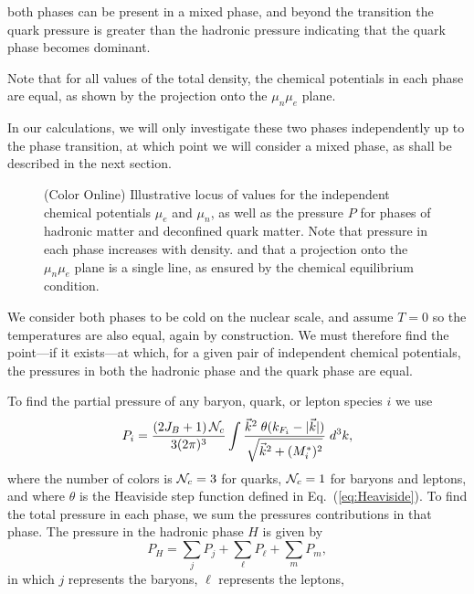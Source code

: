 \documentclass[11pt,a4paper,twoside]{carrollthesis}
\newcommand{\be}{\begin{equation}}
\newcommand{\ee}{\end{equation}}
\newcommand{\bra}{\langle}
\newcommand{\ket}{\rangle}
\newcommand{\s}{\sigma}
\newcommand{\w}{\omega}
\newcommand{\reci}[1]{\frac{1}{#1}}
\newcommand{\emdash}{\hspace{1pt}---\hspace{1pt}}
\begin{document}
both phases can be present in a mixed phase, and beyond the transition
the quark pressure is greater than the hadronic pressure indicating
that the quark phase becomes dominant.\par
%
Note that for all values of the total density, the chemical potentials
in each phase are equal, as shown by the projection onto the
$\mu_n$$\mu_e$ plane.\par
%
In our calculations, we will only
investigate these two phases independently up to the phase transition,
at which point we will consider a mixed phase, as shall be described
in the next section.\par
%
\begin{figure}[!t]
\centering
\caption[Illustrative locus of phase transition variables]{(Color
  Online) Illustrative locus of values for the independent chemical
  potentials $\mu_e$ and $\mu_n$, as well as the pressure $P$ for
  phases of hadronic matter and deconfined quark matter. Note that
  pressure in each phase increases with density. and that a projection
  onto the $\mu_n\mu_e$ plane is a single line, as ensured by the
  chemical equilibrium condition. \protect\label{fig:3d}}
\end{figure}
%
We consider both phases to be cold on the nuclear scale, and assume
$T=0$ so the temperatures are also equal, again by construction. We
must therefore find the point\emdash if it exists\emdash at which, for
a given pair of independent chemical potentials, the pressures in both
the hadronic phase and the quark phase are equal.\par
%
To find the partial pressure of any baryon, quark, or lepton species
$i$ we use
%
\be \label{eq:pressures} P_i = \frac{\left(2J_B + 1\right) {\cal
    N}_c}{3(2\pi)^3}\int \frac{\vec{k}^2\; \theta(k_{F_i} -
  |\vec{k}|)}{\sqrt{\vec{k}^2+(M_i^*)^2}}\; d^3k, \ee
%
where the number of colors is ${\cal N}_c = 3$ for quarks, ${\cal N}_c
= 1$ for baryons and leptons, and where $\theta$ is the Heaviside step
function defined in Eq.~(\ref{eq:Heaviside}). To find the total
pressure in each phase, we sum the pressures contributions in that
phase. The pressure in the hadronic phase $H$ is given by
%
%
%
\be \label{eq:Hpressure}
P_H = \sum_j P_j  + \sum_\ell P_\ell + \sum_m P_m,
\ee
%
in which $j$ represents the baryons, $\ell$ represents the leptons,
$$
\end{document}
